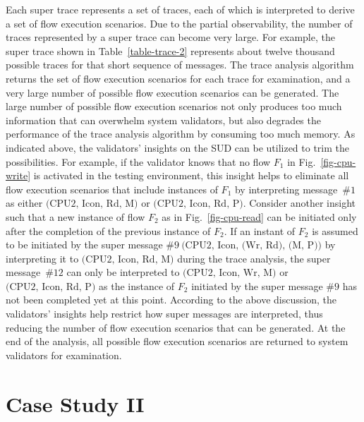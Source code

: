 \documentclass[conference]{IEEEtran}
\begin{document}
Each super trace represents a set of traces, each of which is interpreted to derive a set of flow execution scenarios.
Due to the partial observability, the number of traces represented by a super trace can become very large. For example, the super trace shown in Table~\ref{table-trace-2} represents about twelve thousand possible traces for that short sequence of messages.  The trace analysis algorithm returns the set of flow execution scenarios for each trace for examination, and a very large number of possible flow execution scenarios can be generated.  The large number of possible flow execution scenarios not only produces too much information that can overwhelm system validators, but also degrades the performance of the trace analysis algorithm by consuming too much memory.  As indicated above,  the validators' insights on the SUD can be utilized to trim the possibilities.  For example, if the validator knows that no flow $F_1$ in Fig.~\ref{fig-cpu-write} is activated in the testing environment, this insight helps to eliminate all flow execution scenarios that include instances of $F_1$ by interpreting message~$\#1$ as either $\mbox{(CPU2, Icon, Rd, M)}$ or $\mbox{(CPU2, Icon, Rd, P)}$.  Consider another insight such that a new instance of flow $F_2$ as in Fig.~\ref{fig-cpu-read} can be initiated only after the completion of the previous instance of $F_2$.  If an instant of $F_2$ is assumed to be initiated by the super message $\#9~\mbox{(CPU2, Icon, (Wr, Rd), (M, P))}$ by interpreting it to $\mbox{(CPU2, Icon, Rd, M)}$ during the trace analysis, the super message~$\#12$ can only be interpreted to $\mbox{(CPU2, Icon, Wr, M)}$ or $\mbox{(CPU2, Icon, Rd, P)}$ as the instance of $F_2$ initiated by the super message $\#9$ has not been completed yet at this point.   According to the above discussion, the validators' insights help restrict how super messages are interpreted, thus reducing the number of flow execution scenarios that can be generated.
At the end of the analysis, all possible flow execution scenarios are returned to system validators for examination. 



\section{Case Study II}
\end{document}
